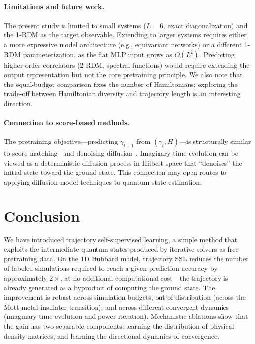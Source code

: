 \documentclass[12pt]{article}
\newcommand{\gam}{\gamma}
\begin{document}
\paragraph{Limitations and future work.}
The present study is limited to small systems ($L=6$, exact diagonalization)
and the 1-RDM as the target observable.
Extending to larger systems requires either a more expressive model architecture
(e.g., equivariant networks) or a different 1-RDM parameterization, as the
flat MLP input grows as $O(L^2)$.
Predicting higher-order correlators (2-RDM, spectral functions) would require
extending the output representation but not the core pretraining principle.
We also note that the equal-budget comparison fixes the number of Hamiltonians;
exploring the trade-off between Hamiltonian diversity and trajectory length
is an interesting direction.

\paragraph{Connection to score-based methods.}
The pretraining objective---predicting $\gam_{t+1}$ from $(\gam_t, H)$---is
structurally similar to score matching~\citep{hyvarinen2005estimation} and
denoising diffusion~\citep{ho2020denoising}.
Imaginary-time evolution can be viewed as a deterministic diffusion process
in Hilbert space that ``denoises'' the initial state toward the ground state.
This connection may open routes to applying diffusion-model techniques
to quantum state estimation.

\section{Conclusion}
\label{sec:conclusion}

We have introduced trajectory self-supervised learning, a simple method that
exploits the intermediate quantum states produced by iterative solvers as free
pretraining data.
On the 1D Hubbard model, trajectory SSL reduces the number of labeled simulations
required to reach a given prediction accuracy by approximately $2\times$,
at no additional computational cost---the trajectory is already generated as
a byproduct of computing the ground state.
The improvement is robust across simulation budgets, out-of-distribution
(across the Mott metal-insulator transition), and across different convergent
dynamics (imaginary-time evolution and power iteration).
Mechanistic ablations show that the gain has two separable components:
learning the distribution of physical density matrices, and learning the
directional dynamics of convergence.
\end{document}
